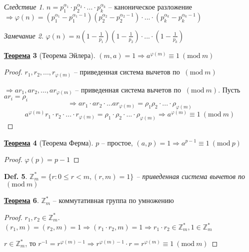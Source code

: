 \documentclass[12pt]{article}
\def\Z{\mathbb{Z}}       %
\def\SO{\Rightarrow}     %
\theoremstyle{definition} %
\newtheorem{Thm}{\underline{Теорема}}[subsection] %
\theoremstyle{plain} %
\newtheorem{Def}[Thm]{Def.} %
\theoremstyle{remark} %
\newtheorem{Cons}[Thm]{Следствие} %
\newtheorem{Rem}[Thm]{Замечание} %
\newcommand{\Mod}[1]{\ (\mathrm{mod}\ #1)}
\begin{document}
\begin{Cons}
    $n = p_1^{\alpha_1} \cdot p_2^{\alpha_2} \cdot ... \cdot p_k^{\alpha_k}$ -- каноническое разложение
    $\SO \varphi(n) = (p_1^{\alpha_1} - p_1^{\alpha_1 - 1})(p_2^{\alpha_2} - p_2^{\alpha_2 - 1}) \cdot ... \cdot (p_k^{\alpha_k} - p_k^{\alpha_k - 1})$  
\end{Cons}

\begin{Rem}
    $\varphi(n) = n(1 - \frac{1}{p_1})(1 - \frac{1}{p_2}) \cdot ... \cdot (1 - \frac{1}{p_k})$ 
\end{Rem}

\begin{Thm}[Теорема Эйлера]
    $(m, a) = 1 \SO a^{\varphi(m)} \equiv 1 \Mod m$ 
\end{Thm}

\begin{proof}
    $r_1, r_2, ..., r_{\varphi(m)}$ -- приведенная система вычетов по $\Mod m$
    
    $\SO ar_1, ar_2, ..., ar_{\varphi(m)}$ -- приведенная система вычетов по $\Mod m$. Пусть $ar_i = \rho_i$
    \[\SO ar_1 \cdot ar_2 \cdot ... ar_{\varphi(m)} = \rho_1 \rho_2 \cdot ... \cdot \rho_{\varphi(m)}\]
    \[a^{\varphi(m)} r_1 \cdot r_2 \cdot ... \cdot r_{\varphi(m)} = \rho_1 \cdot \rho_2 \cdot ... \cdot \rho_{\varphi(m)} \SO a^{\varphi(m)} \equiv 1 \Mod m\]   
\end{proof}

\begin{Thm}[Теорема Ферма]
    $p$ -- простое, $(a, p) = 1 \SO a^{p - 1} \equiv 1 \Mod p$ 
\end{Thm}

\begin{proof}
    $\varphi(p) = p - 1$ 
\end{proof}

\begin{Def}
    $\Z_m^* = \{r : 0 \leqslant r < m, (r, m) = 1\}$ -- приведенная система вычетов по $\Mod m$ 
\end{Def}

\begin{Thm}
    $\Z_m^*$ -- коммутативная группа по умножению
\end{Thm}

\begin{proof}
    $r_1, r_2 \in \Z_m^*$. $(r_1, m) = (r_2, m) = 1 \SO (r_1 \cdot r_2, m) = 1 \SO r_1 \cdot r_2 \in \Z_m^*, 1 \in \Z_m^*$
    
    $r \in \Z_m^*$, то $r^{-1} = r^{\varphi(m) - 1} \SO r^{\varphi(m) - 1} \cdot r = r^{\varphi(m)} \equiv 1 \Mod m$  
\end{proof}
\end{document}

